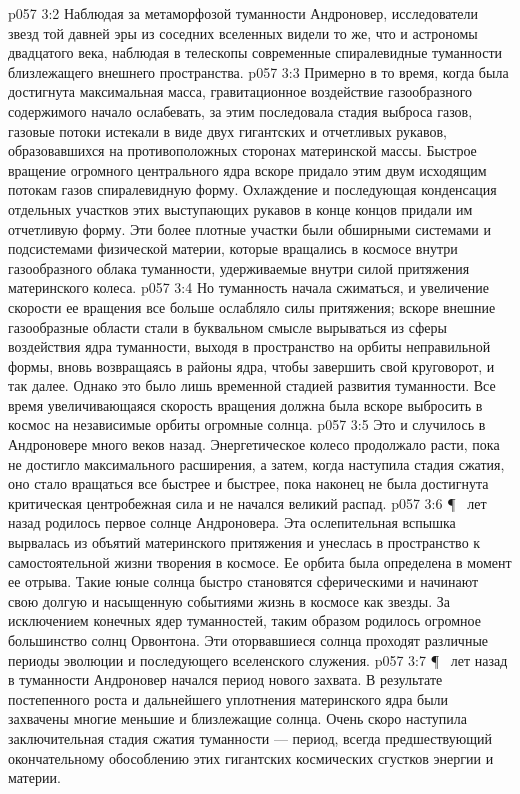 \vs p057 3:2 Наблюдая за метаморфозой туманности Андроновер, исследователи звезд той давней эры из соседних вселенных видели то же, что и астрономы двадцатого века, наблюдая в телескопы современные спиралевидные туманности близлежащего внешнего пространства.
\vs p057 3:3 Примерно в то время, когда была достигнута максимальная масса, гравитационное воздействие газообразного содержимого начало ослабевать, за этим последовала стадия выброса газов, газовые потоки истекали в виде двух гигантских и отчетливых рукавов, образовавшихся на противоположных сторонах материнской массы. Быстрое вращение огромного центрального ядра вскоре придало этим двум исходящим потокам газов спиралевидную форму. Охлаждение и последующая конденсация отдельных участков этих выступающих рукавов в конце концов придали им отчетливую форму. Эти более плотные участки были обширными системами и подсистемами физической материи, которые вращались в космосе внутри газообразного облака туманности, удерживаемые внутри силой притяжения материнского колеса.
\vs p057 3:4 Но туманность начала сжиматься, и увеличение скорости ее вращения все больше ослабляло силы притяжения; вскоре внешние газообразные области стали в буквальном смысле вырываться из сферы воздействия ядра туманности, выходя в пространство на орбиты неправильной формы, вновь возвращаясь в районы ядра, чтобы завершить свой круговорот, и так далее. Однако это было лишь временной стадией развития туманности. Все время увеличивающаяся скорость вращения должна была вскоре выбросить в космос на независимые орбиты огромные солнца.
\vs p057 3:5 Это и случилось в Андроновере много веков назад. Энергетическое колесо продолжало расти, пока не достигло максимального расширения, а затем, когда наступила стадия сжатия, оно стало вращаться все быстрее и быстрее, пока наконец не была достигнута критическая центробежная сила и не начался великий распад.
\vs p057 3:6 \P\  лет назад родилось первое солнце Андроновера. Эта ослепительная вспышка вырвалась из объятий материнского притяжения и унеслась в пространство к самостоятельной жизни творения в космосе. Ее орбита была определена в момент ее отрыва. Такие юные солнца быстро становятся сферическими и начинают свою долгую и насыщенную событиями жизнь в космосе как звезды. За исключением конечных ядер туманностей, таким образом родилось огромное большинство солнц Орвонтона. Эти оторвавшиеся солнца проходят различные периоды эволюции и последующего вселенского служения.
\vs p057 3:7 \P\  лет назад в туманности Андроновер начался период нового захвата. В результате постепенного роста и дальнейшего уплотнения материнского ядра были захвачены многие меньшие и близлежащие солнца. Очень скоро наступила заключительная стадия сжатия туманности --- период, всегда предшествующий окончательному обособлению этих гигантских космических сгустков энергии и материи.
